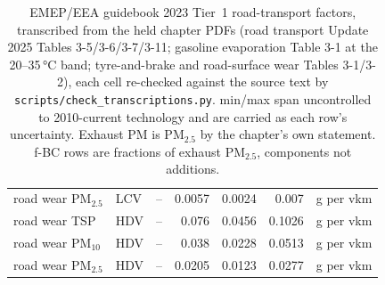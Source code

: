 \begin{table}[!htbp]
\begin{tabular}{@{}lllrrrl@{}}
road wear PM$_{2.5}$ & LCV & -- & 0.0057 & 0.0024 & 0.007 & g per vkm \\
road wear TSP & HDV & -- & 0.076 & 0.0456 & 0.1026 & g per vkm \\
road wear PM$_{10}$ & HDV & -- & 0.038 & 0.0228 & 0.0513 & g per vkm \\
road wear PM$_{2.5}$ & HDV & -- & 0.0205 & 0.0123 & 0.0277 & g per vkm \\
\bottomrule
\end{tabular}
\caption{EMEP/EEA guidebook 2023 Tier~1 road-transport factors, transcribed
from the held chapter PDFs (road transport Update 2025 Tables 3-5/3-6/3-7/3-11;
gasoline evaporation Table 3-1 at the 20--35\,\si{\celsius} band; tyre-and-brake
and road-surface wear Tables 3-1/3-2), each cell re-checked against the source
text by \texttt{scripts/check\_transcriptions.py}. min/max span uncontrolled to
2010-current technology and are carried as each row's uncertainty. Exhaust PM is
PM$_{2.5}$ by the chapter's own statement. f-BC rows are fractions of exhaust
PM$_{2.5}$, components not additions.}
\label{tab:s2emep}
\end{table}

